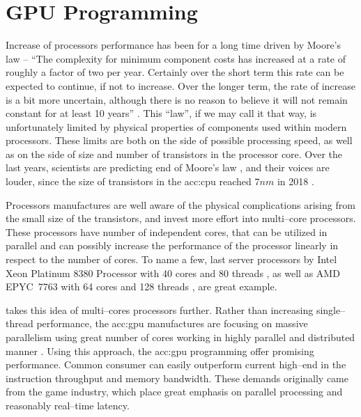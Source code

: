 \chapter{GPU Programming}

Increase of processors performance has been for a long time driven by Moore's law -- \enquote{The complexity for minimum component costs has increased at a rate of roughly a factor of two per year. Certainly over the short term this rate can be expected to continue, if not to increase. Over the longer term, the rate of increase is a bit more uncertain, although there is no reason to believe it will not remain constant for at least 10 years} \citep{MooresLaw}. This \enquote{law}, if we may call it that way, is unfortunately limited by physical properties of components used within modern processors. These limits are both on the side of possible processing speed, as well as on the side of size and number of transistors in the processor core. Over the last years, scientists are predicting end of Moore's law \citep{MooresLawEnd}, and their voices are louder, since the size of transistors in the \acrfull{acc:cpu} reached $7nm$ in 2018 \citep{SamsungSevenNm}. 

Processors manufactures are well aware of the physical complications arising from the small size of the transistors, and invest more effort into multi--core processors. These processors have number of independent cores, that can be utilized in parallel and can possibly increase the performance of the processor linearly in respect to the number of cores. To name a few, last server processors by Intel\textsuperscript{\textregistered} Xeon\textsuperscript{\textregistered} Platinum 8380 Processor with 40 cores and 80 threads \citep{IntelXeonPlatinum}, as well as AMD EPYC\texttrademark\ 7763 with 64 cores and 128 threads \citep{AMDEpyc}, are great example.

 takes this idea of multi--cores processors further. Rather than increasing single--thread performance, the \acrshort{acc:gpu} manufactures are focusing on massive parallelism using great number of cores working in highly parallel and distributed manner \citep{GPUComputingOwens}. Using this approach, the \acrshort{acc:gpu} programming offer promising performance. Common consumer  can easily outperform current high--end  in the instruction throughput and memory bandwidth. These demands originally came from the game industry, which place great emphasis on parallel processing and reasonably real--time latency. 

